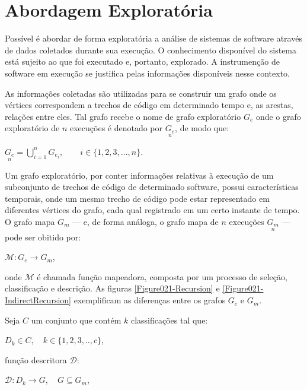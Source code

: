 
\section{Abordagem Exploratória}

Possível é abordar de forma exploratória a análise de sistemas de software
através de dados coletados durante sua execução. O conhecimento disponível do
sistema está sujeito ao que foi executado e, portanto, explorado. A instrumenção
de software em execução se justifica pelas informações disponíveis nesse
contexto.

As informações coletadas são utilizadas para se construir um grafo onde os
vértices correspondem a trechos de código em determinado tempo e, as arestas,
relações entre eles. Tal grafo recebe o nome de grafo exploratório $G_e$ onde o
grafo exploratório de $n$ execuções é denotado por $\underset{n}{G_e}$, de modo
que:

\begin{center}
  $\underset{n}{G_e} = \bigcup\limits_{i=1}^n G_{e_i},
   \qquad i \in \{ 1,2,3,...,n \}.$
\end{center}

Um grafo exploratório, por conter informações relativas à execução de um
subconjunto de trechos de código de determinado software, possui características
temporais, onde um mesmo trecho de código pode estar representado em diferentes
vértices do grafo, cada qual registrado em um certo instante de tempo. O grafo
mapa $G_m$ --- e, de forma análoga, o grafo mapa de $n$ execuções
$\underset{n}{G_m}$ --- pode ser obitido por:

\begin{center}
  $\mathcal{M}:G_e \rightarrow G_m$,
\end{center}

onde $\mathcal{M}$ é chamada função mapeadora, composta por um processo de
seleção, classificação e descrição. As figuras \ref{Figure021-Recursion} e \ref{Figure021-IndirectRecursion}
exemplificam as diferenças entre os grafos $G_e$ e $G_m$.

Seja $C$ um conjunto que contém $k$ classificações tal que:

\begin{center}
  $D_k \in C, \quad k \in \{ 1, 2, 3, .., c \}$,
\end{center}

função descritora $\mathcal{D}$:

\begin{center}
  $\mathcal{D}:D_k \rightarrow G, \quad G \subseteq {G_m}$,
\end{center}

